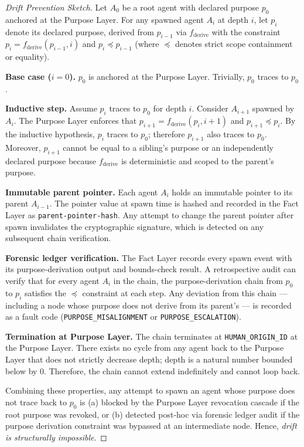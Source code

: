 \begin{proof}[Drift Prevention Sketch]
Let $A_0$ be a root agent with declared purpose $p_0$ anchored at the Purpose Layer. For any spawned agent $A_i$ at depth $i$, let $p_i$ denote its declared purpose, derived from $p_{i-1}$ via $f_{\text{derive}}$ with the constraint $p_i = f_{\text{derive}}(p_{i-1}, i)$ and $p_i \preceq p_{i-1}$ (where $\preceq$ denotes strict scope containment or equality).

\textbf{Base case ($i = 0$).} $p_0$ is anchored at the Purpose Layer. Trivially, $p_0$ traces to $p_0$.

\textbf{Inductive step.} Assume $p_i$ traces to $p_0$ for depth $i$. Consider $A_{i+1}$ spawned by $A_i$. The Purpose Layer enforces that $p_{i+1} = f_{\text{derive}}(p_i, i+1)$ and $p_{i+1} \preceq p_i$. By the inductive hypothesis, $p_i$ traces to $p_0$; therefore $p_{i+1}$ also traces to $p_0$. Moreover, $p_{i+1}$ cannot be equal to a sibling's purpose or an independently declared purpose because $f_{\text{derive}}$ is deterministic and scoped to the parent's purpose.

\textbf{Immutable parent pointer.} Each agent $A_i$ holds an immutable pointer to its parent $A_{i-1}$. The pointer value at spawn time is hashed and recorded in the Fact Layer as \texttt{parent-pointer-hash}. Any attempt to change the parent pointer after spawn invalidates the cryptographic signature, which is detected on any subsequent chain verification.

\textbf{Forensic ledger verification.} The Fact Layer records every spawn event with its purpose-derivation output and bounds-check result. A retrospective audit can verify that for every agent $A_i$ in the chain, the purpose-derivation chain from $p_0$ to $p_i$ satisfies the $\preceq$ constraint at each step. Any deviation from this chain — including a node whose purpose does not derive from its parent's — is recorded as a fault code (\texttt{PURPOSE\_MISALIGNMENT} or \texttt{PURPOSE\_ESCALATION}).

\textbf{Termination at Purpose Layer.} The chain terminates at \texttt{HUMAN\_ORIGIN\_ID} at the Purpose Layer. There exists no cycle from any agent back to the Purpose Layer that does not strictly decrease depth; depth is a natural number bounded below by $0$. Therefore, the chain cannot extend indefinitely and cannot loop back.

Combining these properties, any attempt to spawn an agent whose purpose does not trace back to $p_0$ is (a) blocked by the Purpose Layer revocation cascade if the root purpose was revoked, or (b) detected post-hoc via forensic ledger audit if the purpose derivation constraint was bypassed at an intermediate node. Hence, \textit{drift is structurally impossible}.


\end{proof}
